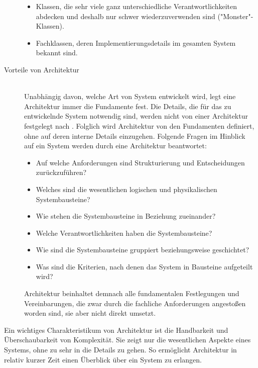 \begin{description}
\begin{itemize}
  \item Klassen, die sehr viele ganz unterschiedliche Verantwortlichkeiten abdecken und deshalb nur schwer wiederzuverwenden sind ("Monster"-Klassen).
  \item Fachklassen, deren Implementierungsdetails im gesamten System bekannt sind.
  \end{itemize}
\item[Vorteile von Architektur] \hfill \\
  Unabhängig davon, welche Art von System entwickelt wird, legt eine Architektur immer die Fundamente fest. Die Details, die für das zu entwickelnde System notwendig sind, werden nicht von einer Architektur festgelegt \citereset \autocite[siehe][]{Buschmann.1996} nach \citereset \autocite[siehe][S. 6-8]{Vogel.2009}. Folglich wird Architektur von den Fundamenten definiert, ohne auf deren interne Details einzugehen. Folgende Fragen im Hinblick auf ein System werden durch eine Architektur beantwortet:
  \begin{itemize}
  \item Auf welche Anforderungen sind Strukturierung und Entscheidungen zurückzuführen?
  \item Welches sind die wesentlichen logischen und physikalischen Systembausteine?
  \item Wie stehen die Systembausteine in Beziehung zueinander?
  \item Welche Verantwortlichkeiten haben die Systembausteine?
  \item Wie sind die Systembausteine gruppiert beziehungsweise geschichtet?
  \item Was sind die Kriterien, nach denen das System in Bausteine aufgeteilt wird?
  \end{itemize}
Architektur beinhaltet demnach alle fundamentalen Festlegungen und Vereinbarungen, die zwar durch die fachliche Anforderungen angestoßen worden sind, sie aber nicht direkt umsetzt.
\end{description}

Ein wichtiges Charakteristikum von Architektur ist die Handbarkeit und Überschaubarkeit von Komplexität. Sie zeigt nur die wesentlichen Aspekte eines Systems, ohne zu sehr in die Details zu gehen. So ermöglicht Architektur in relativ kurzer Zeit einen Überblick über ein System zu erlangen.

